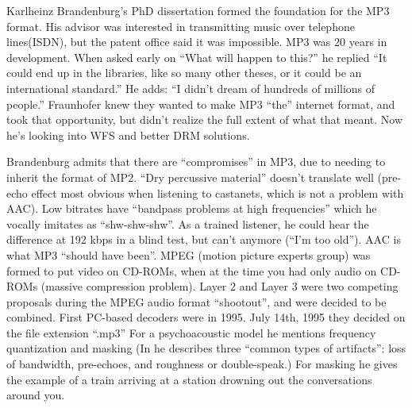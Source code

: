 \documentclass{thesis}
\begin{document}
Karlheinz Brandenburg's PhD dissertation formed the foundation for the MP3 format. His advisor was interested in transmitting music over telephone lines(ISDN), but the patent office said it was impossible. MP3 was 20 years in development. When asked early on ``What will happen to this?'' he replied ``It could end up in the libraries, like so many other theses, or it could be an international standard.'' He adds: ``I didn't dream of hundreds of millions of people.'' Fraunhofer knew they wanted to make MP3 ``the'' internet format, and took that opportunity, but didn't realize the full extent of what that meant. Now he's looking into WFS and better DRM solutions.\cite{brandenburg_interviews_2004}
	
Brandenburg admits that there are ``compromises'' in MP3, due to needing to inherit the format of MP2. ``Dry percussive material'' doesn't translate well (pre-echo effect most obvious when listening to castanets, which is not a problem with AAC). Low bitrates have ``bandpass problems at high frequencies'' which he vocally imitates as ``shw-shw-shw''. As a trained listener, he could hear the difference at 192 kbps in a blind test, but can't anymore (``I'm too old''). AAC is what MP3 ``should have been''. MPEG (motion picture experts group) was formed to put video on CD-ROMs, when at the time you had only audio on CD-ROMs (massive compression problem). Layer 2 and Layer 3 were two competing proposals during the MPEG audio format ``shootout'', and were decided to be combined. First PC-based decoders were in 1995. July 14th, 1995 they decided on the file extension ``.mp3'' For a psychoacoustic model he mentions frequency quantization and masking (In \cite{karlheinz_brandenburg_mp3_1999} he describes three ``common types of artifacts'': loss of bandwidth, pre-echoes, and roughness or double-speak.) For masking he gives the example of a train arriving at a station drowning out the conversations around you.
\end{document}
